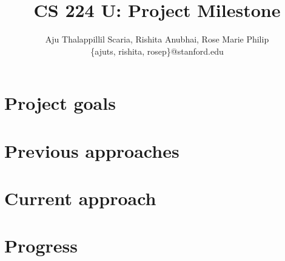 \documentclass[letterpaper]{article}
\begin{document}
\title{
CS 224 U: Project Milestone
}

\author{
Aju Thalappillil Scaria, Rishita Anubhai, Rose Marie Philip \\
\{ajuts, rishita, rosep\}@stanford.edu\\
}

\maketitle


%

\section{Project goals}
\label{sec:projectgoals}


\section{Previous approaches}
\label{sec:previousapproaches}


\section{Current approach}
\label{sec:currentapproach}


\section{Progress}
\label{sec:progress}





%
\end{document}
